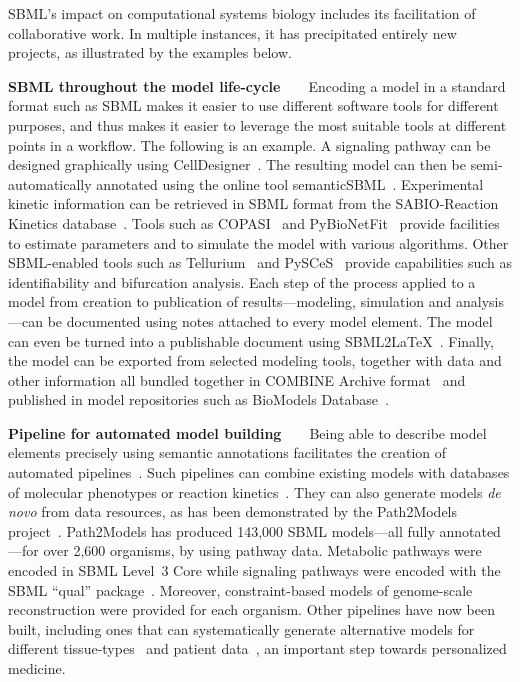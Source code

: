 \documentclass{sbml-paper}
\begin{document}
SBML's impact on computational systems biology includes its facilitation of collaborative work.  In multiple instances, it has precipitated entirely new projects, as illustrated by the examples below.

\textbf{SBML throughout the model life-cycle}~~~~Encoding a model in a standard format such as SBML makes it easier to use different software tools for different purposes, and thus makes it easier to leverage the most suitable tools at different points in a workflow.  The following is an example.  A signaling pathway can be designed graphically using CellDesigner~\citep{Funahashi2003celldesignera}. The resulting model can then be semi-automatically annotated using the online tool semanticSBML~\citep{krause2010annotation}. Experimental kinetic information can be retrieved in SBML format from the SABIO-Reaction Kinetics database~\citep{wittig2017sabio}. Tools such as COPASI~\citep{hoops2006copasi} and PyBioNetFit~\citep{Mitra2019pybionetfit} provide facilities to estimate parameters and to simulate the model with various algorithms. Other SBML-enabled tools such as Tellurium~\citep{Medley2018tellurium} and PySCeS~\citep{olivier2005modelling} provide capabilities such as identifiability and bifurcation analysis. Each step of the process applied to a model from creation to publication of results---modeling, simulation and analysis---can be documented using notes attached to every model element. The model can even be turned into a publishable document using SBML2\LaTeX~\citep{Draeger2009b}.  Finally, the model can be exported from selected modeling tools, together with data and other information all bundled together in COMBINE Archive format~\citep{bergmann2014combine} 
and published in model repositories such as BioModels Database~\citep{Malik-Sheriff2020biomodels}.

\textbf{Pipeline for automated model building}~~~~Being able to describe model elements precisely using semantic annotations facilitates the creation of automated pipelines~\citep{Drager2010automating}. Such pipelines can combine existing models with databases of molecular phenotypes or reaction kinetics~\citep{li2010systematic}.  They can also generate models \emph{de novo} from data resources, as has been demonstrated by the Path2Models project~\citep{buchel2013path2models}. Path2Models has produced 143,000 SBML models---all fully annotated---for over 2,600 organisms, by using pathway data. Metabolic pathways were encoded in SBML Level~3 Core while signaling pathways were encoded with the SBML ``qual'' package~\citep{chaouiya2013sbml}. Moreover, constraint-based models of genome-scale reconstruction were provided for each organism. Other pipelines have now been built, including ones that can systematically generate alternative models for different tissue-types~\citep{wang2012reconstruction} and patient data~\citep{uhlen2017pathology}, an important step towards personalized medicine.
\end{document}
